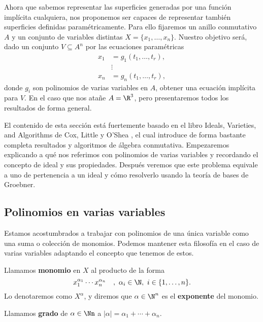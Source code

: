 
Ahora que sabemos representar las superficies generadas por una función implícita cualquiera, nos proponemos ser capaces de representar también superficies definidas paramétricamente. Para ello fijaremos un anillo conmutativo $A$ y un conjunto de variables distintas $X=\{x_1,\dots, x_n\}$. Nuestro objetivo será, dado un conjunto $V\subseteq A^n$ por las ecuaciones paramétricas
\begin{align*}
    x_1 &= g_1(t_1,\dots, t_r),\\
    &\vdots \\
    x_n &= g_n(t_1,\dots, t_r),
\end{align*}
donde $g_i$ son polinomios de varias variables en $A$, obtener una ecuación implícita para $V$. En el caso que nos atañe $A=\R^3$, pero presentaremos todos los resultados de forma general.\newline

El contenido de esta sección está fuertemente basado en el libro Ideals, Varieties, and Algorithms de Cox, Little y O'Shea \cite{ideals_varieties}, el cual introduce de forma bastante completa resultados y algoritmos de álgebra conmutativa. Empezaremos explicando a qué nos referimos con polinomios de varias variables y recordando el concepto de ideal y sus propiedades. Después veremos que este problema equivale a uno de pertenencia a un ideal y cómo resolverlo usando la teoría de bases de Groebner.

\subsection{Polinomios en varias variables}
Estamos acostumbrados a trabajar con polinomios de una única variable como una suma o colección de monomios. Podemos mantener esta filosofía en el caso de varias variables adaptando el concepto que tenemos de estos.

\begin{definicion}
    Llamamos \textbf{monomio} en $X$ al producto de la forma
    $$x_1^{\alpha_1} \cdots x_n^{\alpha_n}\quad,\ \alpha_i \in \N,\ i\in\{1,\dots, n\}.$$
    Lo denotaremos como $X^{\alpha}$, y diremos que $\alpha\in \N^n$ es el \textbf{exponente} del monomio.
\end{definicion}


\begin{definicion}
    Llamamos \textbf{grado} de $\alpha\in\Nn$ a $\vert \alpha\vert = \alpha_1+\cdots + \alpha_n$.
\end{definicion}

